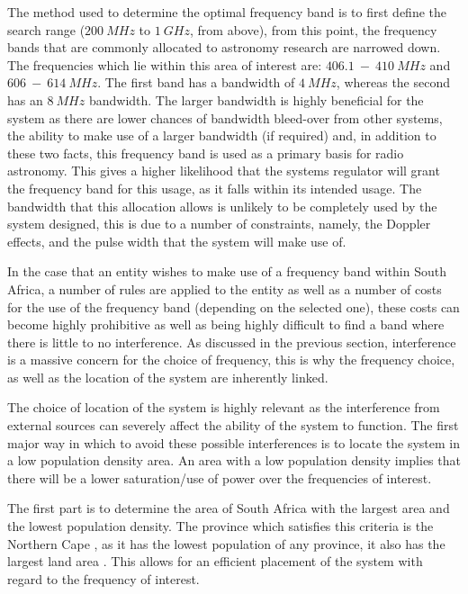 \documentclass[11pt]{witseiepaper}
\begin{document}
\begin{bibunit}[witseie]
The method used to determine the optimal frequency band is to first define the search range ($200~MHz$ to $1~GHz$, from above), from this point, the frequency bands that are commonly allocated to astronomy research are narrowed down. The frequencies which lie within this area of interest are: $406.1~-~410~MHz$ and $606~-~614~MHz$. 
The first band has a bandwidth of $4~MHz$, whereas the second has an $8~MHz$ bandwidth. The larger bandwidth is highly beneficial for the system as there are lower chances of bandwidth bleed-over from other systems, the ability to make use of a larger bandwidth (if required) and, in addition to these two facts, this frequency band is used as a primary basis for radio astronomy.
This gives a higher likelihood that the systems regulator will grant the frequency band for this usage, as it falls within its intended usage.
The bandwidth that this allocation allows is unlikely to be completely used by the system designed, this is due to a number of constraints, namely, the Doppler effects, and the pulse width that the system will make use of.

In the case that an entity wishes to make use of a frequency band within South Africa, a number of rules are applied to the entity as well as a number of costs for the use of the frequency band (depending on the selected one), these costs can become highly prohibitive as well as being highly difficult to find a band where there is little to no interference.
As discussed in the previous section, interference is a massive concern for the choice of frequency, this is why the frequency choice, as well as the location of the system are inherently linked.


The choice of location of the system is highly relevant as the interference from external sources can severely affect the ability of the system to function. The first major way in which to avoid these possible interferences is to locate the system in a low population density area. An area with a low population density implies that there will be a lower saturation/use of power over the frequencies of interest.

The first part is to determine the area of South Africa with the largest area and the lowest population density. The province which satisfies this criteria is the Northern Cape \cite[p.~18]{statsSASurvey1}, as it has the lowest population of any province, it also has the largest land area \cite[p.~9,15]{statsSASurvey2}. This allows for an efficient placement of the system with regard to the frequency of interest.


\end{bibunit}
\end{document}
